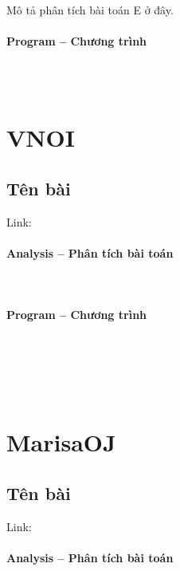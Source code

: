 \documentclass{article}
\begin{document}
Mô tả phân tích bài toán E ở đây.

\paragraph{Program -- Chương trình} \mbox{} \\

\begin{lstlisting} 

\end{lstlisting}


\section{VNOI}

\subsection{Tên bài}
Link: \url{}


\paragraph{Analysis -- Phân tích bài toán} \mbox{} \\


\paragraph{Program -- Chương trình} \mbox{} \\


\begin{lstlisting}

	
\end{lstlisting}

\section{MarisaOJ}

\subsection{Tên bài}
Link: \url{}
 

\paragraph{Analysis -- Phân tích bài toán} \mbox{} \\
\end{document}
